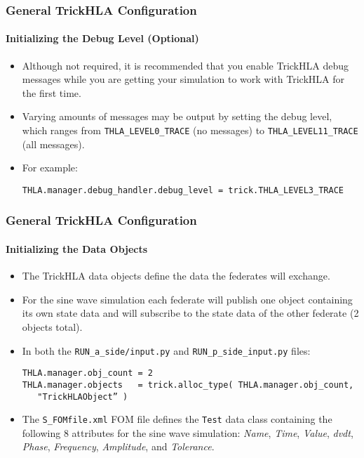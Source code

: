    \begin{frame}[fragile]
      \frametitle{General TrickHLA Configuration}
      \framesubtitle{Initializing the Debug Level (Optional)}
      \begin{itemize}
         \item Although not required, it is recommended that you enable TrickHLA
         debug messages while you are getting your simulation to work with
         TrickHLA for the first time.
         \item Varying amounts of messages may be output by setting the debug
         level, which ranges from \texttt{THLA\_LEVEL0\_TRACE} (no messages) to
         \texttt{THLA\_LEVEL11\_TRACE} (all messages).
         \item For example:
\begin{Verbatim}[frame=single, fontsize=\footnotesize]
THLA.manager.debug_handler.debug_level = trick.THLA_LEVEL3_TRACE
\end{Verbatim}
      \end{itemize}
   \end{frame}
   
   \begin{frame}[fragile]
      \frametitle{General TrickHLA Configuration}
      \framesubtitle{Initializing the Data Objects}
      \begin{itemize}
         \item The TrickHLA data objects define the data the federates will exchange.
         \item For the sine wave simulation each federate will publish one
         object containing its own state data and will subscribe to the state
         data of the other federate (2 objects total).
         \item In both the \texttt{RUN\_a\_side/input.py} and \texttt{RUN\_p\_side\_input.py} files:
\begin{Verbatim}[frame=single, fontsize=\footnotesize]
THLA.manager.obj_count = 2
THLA.manager.objects   = trick.alloc_type( THLA.manager.obj_count,
   "TrickHLAObject” )
\end{Verbatim}
         \item The \texttt{S\_FOMfile.xml} FOM file defines the \texttt{Test} data class
         containing the following 8 attributes for the sine wave simulation:
         \textit{Name}, \textit{Time}, \textit{Value}, \textit{dvdt}, \textit{Phase},
         \textit{Frequency}, \textit{Amplitude}, and \textit{Tolerance}.
      \end{itemize}
   \end{frame}
   
